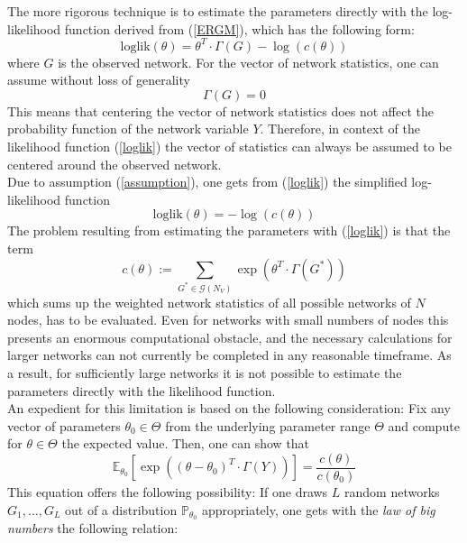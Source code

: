 \documentclass[headsepline=true, abstracton]{scrartcl}
\begin{document}
The more rigorous technique is to estimate the parameters directly with the log-likelihood function derived from (\ref{ERGM}), which has the following form:
%
\begin{equation}
\text{loglik}(\theta)=\theta^T \cdot \Gamma(G)-\log(c(\theta))
\label{loglik}
\end{equation}
%
where $G$ is the observed network. For the vector of network statistics, one can assume without loss of generality
%
\begin{equation}
\Gamma(G)=0 \label{assumption}
\end{equation}
%
This means that centering the vector of network statistics does not affect the probability function of the network variable $Y$. Therefore, in context of the likelihood function (\ref{loglik}) the vector of statistics can always be assumed to be centered around the observed network.\\
Due to assumption (\ref{assumption}), one gets from (\ref{loglik}) the simplified log-likelihood function
%
\begin{equation}
\text{loglik}(\theta)= -\log(c(\theta))
\label{vloglik}
\end{equation}
%
The problem resulting from estimating the parameters with (\ref{loglik}) is that the term
%
$$c(\theta):= \sum_{G^* \in \mathcal{G}(N_V)} \exp(\theta^T \cdot \Gamma(G^*))$$ 
%
which sums up the weighted network statistics of all possible networks of $N$ nodes, has to be evaluated. Even for networks with small numbers of nodes this presents an enormous computational obstacle, and the necessary calculations for larger networks can not currently be completed in any reasonable timeframe.
As a result, for sufficiently large networks it is not possible to estimate the parameters directly with the likelihood function.
\\[0.3cm]
An expedient for this limitation is based on the following consideration: Fix any vector of parameters $\theta_0 \in \Theta$ from the underlying parameter range $\Theta$ and compute for $\theta \in \Theta$ the expected value. Then, one can show that
%
\begin{equation*}
\mathbb{E}_{\theta_0}\left[ \exp\left((\theta - \theta_0)^T \cdot \Gamma(Y)\right) \right]=\frac{c(\theta)}{c(\theta_0)}
\end{equation*}
%
This equation offers the following possibility: If one draws $L$ random networks $G_1, \dots ,G_L$ out of a distribution $\mathbb{P}_{\theta_0}$ appropriately, one gets with the \textit{law of big numbers} the following relation:
\end{document}
